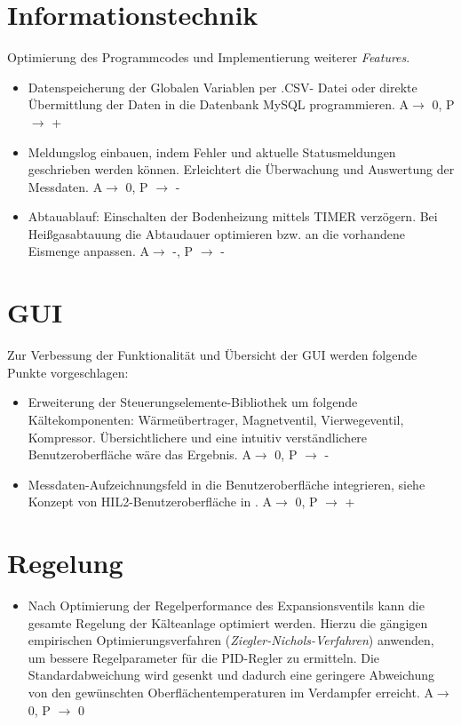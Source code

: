 \section*{Informationstechnik}
Optimierung des Programmcodes und Implementierung weiterer \textit{Features}. 
\begin{itemize}
\item Datenspeicherung der Globalen Variablen per .CSV- Datei oder direkte Übermittlung der Daten in die Datenbank MySQL programmieren. A$\rightarrow$ 0, P $\rightarrow$ +
\item Meldungslog einbauen, indem Fehler und aktuelle Statusmeldungen geschrieben werden können. Erleichtert die Überwachung und Auswertung der Messdaten. A$\rightarrow$ 0, P $\rightarrow$ -
\item Abtauablauf: Einschalten der Bodenheizung mittels TIMER verzögern. Bei Heißgasabtauung die Abtaudauer optimieren bzw. an die vorhandene Eismenge anpassen.  A$\rightarrow$ -, P $\rightarrow$ -
\end{itemize}

\section*{GUI}
Zur Verbessung der Funktionalität und Übersicht der GUI werden folgende Punkte vorgeschlagen: 

\begin{itemize}
\item Erweiterung der Steuerungselemente-Bibliothek um folgende Kältekomponenten: Wärmeübertrager, Magnetventil, Vierwegeventil, Kompressor. Übersichtlichere und eine intuitiv verständlichere Benutzeroberfläche wäre das Ergebnis. A$\rightarrow$ 0, P $\rightarrow$ -
\item Messdaten-Aufzeichnungsfeld in die Benutzeroberfläche integrieren, siehe Konzept von HIL2-Benutzeroberfläche in \textsc{\citeauthor{Nuerenberg2015}}. A$\rightarrow$ 0, P $\rightarrow$ +
\end{itemize}

\section*{Regelung}
	\begin{itemize}
	\item Nach Optimierung der Regelperformance des Expansionsventils kann die gesamte Regelung der Kälteanlage optimiert werden. Hierzu die gängigen empirischen Optimierungsverfahren (\textit{Ziegler-Nichols-Verfahren}) anwenden, um bessere Regelparameter für die PID-Regler zu ermitteln. Die Standardabweichung wird gesenkt und dadurch eine geringere Abweichung von den gewünschten Oberflächentemperaturen im Verdampfer erreicht. A$\rightarrow$ 0, P $\rightarrow$ 0
	\end{itemize}

